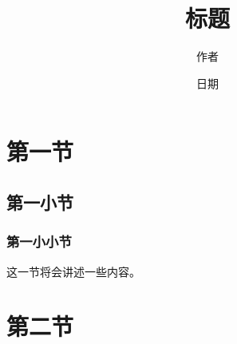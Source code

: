 \documentclass[a4paper,12pt]{article}
\begin{document}
\begin{CJK}{UTF8}{song}
\title{标题}
\author{作者}
\date{日期}
\maketitle
\normalsize

\tableofcontents

\section{第一节}
\subsection{第一小节}
\subsubsection{第一小小节}
这一节将会讲述一些内容。
\section{第二节}

%

\end{CJK}
\end{document}
